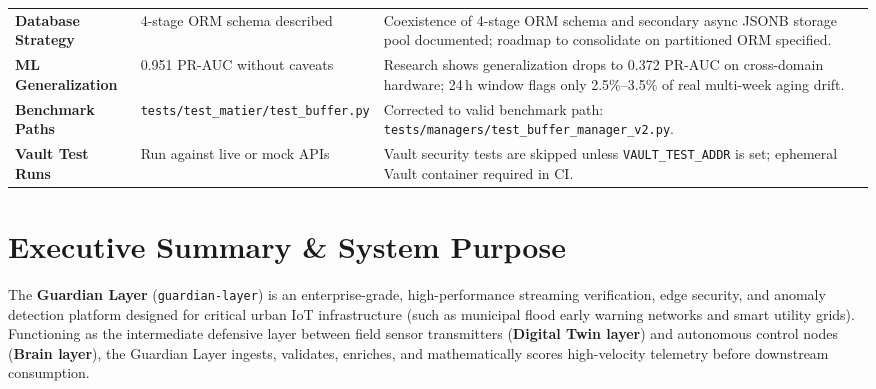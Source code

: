 \documentclass[10pt,a4paper]{report}
\begin{document}
\begin{table}[htbp]
\begin{tabularx}{\textwidth}{lXp{6.5cm}}
\textbf{Database Strategy} & 4-stage ORM schema described & Coexistence of 4-stage ORM schema and secondary async JSONB storage pool documented; roadmap to consolidate on partitioned ORM specified. \\
\textbf{ML Generalization} & 0.951 PR-AUC without caveats & Research shows generalization drops to 0.372 PR-AUC on cross-domain hardware; 24\,h window flags only 2.5\%--3.5\% of real multi-week aging drift. \\
\textbf{Benchmark Paths} & \texttt{tests/test\_matier/test\_buffer.py} & Corrected to valid benchmark path: \texttt{tests/managers/test\_buffer\_manager\_v2.py}. \\
\textbf{Vault Test Runs} & Run against live or mock APIs & Vault security tests are skipped unless \texttt{VAULT\_TEST\_ADDR} is set; ephemeral Vault container required in CI. \\
\bottomrule
\end{tabularx}
\end{table}

\newpage

\chapter{Executive Summary \& System Purpose}

The \textbf{Guardian Layer} (\texttt{guardian-layer}) is an enterprise-grade, high-performance streaming verification, edge security, and anomaly detection platform designed for critical urban IoT infrastructure (such as municipal flood early warning networks and smart utility grids). Functioning as the intermediate defensive layer between field sensor transmitters (\textbf{Digital Twin layer}) and autonomous control nodes (\textbf{Brain layer}), the Guardian Layer ingests, validates, enriches, and mathematically scores high-velocity telemetry before downstream consumption.
\end{document}
